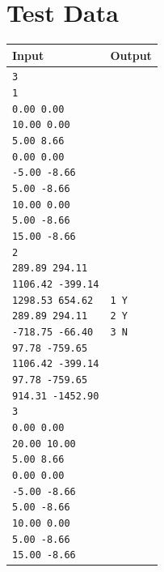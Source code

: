 \documentclass[11pt]{article}
\begin{document}
\section{Test Data}
\begin{tabularx}{\textwidth}{|X|X|}
	\hline
	Input & Output \\ \hline
	\parbox[t]{5cm}{
	\texttt{3\\
			1\\
			0.00 0.00\\
			10.00 0.00\\
			5.00 8.66\\
			0.00 0.00\\
			-5.00 -8.66\\
			5.00 -8.66\\
			10.00 0.00\\
			5.00 -8.66\\
			15.00 -8.66\\
			2\\
			289.89 294.11\\
			1106.42 -399.14\\
			1298.53 654.62\\
			289.89 294.11\\
			-718.75 -66.40\\
			97.78 -759.65\\
			1106.42 -399.14\\
			97.78 -759.65\\
			914.31 -1452.90\\
			3\\
			0.00 0.00\\
			20.00 10.00\\
			5.00 8.66\\
			0.00 0.00\\
			-5.00 -8.66\\
			5.00 -8.66\\
			10.00 0.00\\
			5.00 -8.66\\
			15.00 -8.66\\
	}} &
	\parbox[t]{5cm}{
	\texttt{1 Y\\
			2 Y\\
			3 N\\
	}}\\
	\hline
\end{tabularx}
\end{document}
